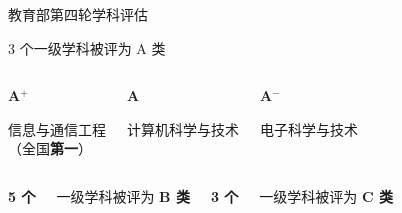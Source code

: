\documentclass[aspectratio=169, utf8, fontset=windows]{beamer}
\begin{document}
\begin{frame}{教育部第四轮学科评估}
    \begin{block}{3 个一级学科被评为 A 类}
        \centering
        \begin{columns}
            \begin{center}
                \Large\textcolor{Fore}{\textbf{A$^+$}}

                \normalsize 信息与通信工程\\（全国\textcolor{Fore}{\textbf{第一}}）
            \end{center}

            \begin{center}
                \Large\textcolor{Fore}{\textbf{A}}

                \normalsize 计算机科学与技术
            \end{center}

            \begin{center}
                \Large\textcolor{Fore}{\textbf{A$^-$}}

                \normalsize 电子科学与技术
            \end{center}
        \end{columns}

        \vspace{1em}
    \end{block}

    \scriptsize\vspace{1em}

    \begin{columns}
        \centering
        \Large\textcolor{Fore}{\textbf{5 个}}

        \normalsize 一级学科被评为 \textcolor{Fore}{\textbf{B 类}}

        \centering
        \Large\textcolor{Fore}{\textbf{3 个}}

        \normalsize 一级学科被评为 \textcolor{Fore}{\textbf{C 类}}

    \end{columns}
\end{frame}
\end{document}
